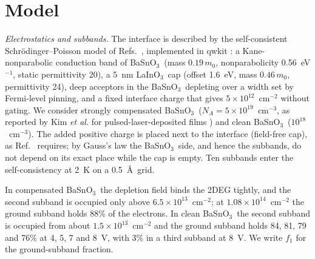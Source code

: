 \documentclass[11pt]{article}
\newcommand{\LIO}{\texorpdfstring{LaInO$_3$}{LaInO3}}
\newcommand{\BSO}{\texorpdfstring{BaSnO$_3$}{BaSnO3}}
\begin{document}
\section{Model}\label{sec:model}
\emph{Electrostatics and subbands.} The interface is described by the self-consistent Schr\"odinger--Poisson model of Refs.~\cite{OwnbyMAT01,OwnbyMAT02}, implemented in qwkit \cite{qwkit}: a Kane-nonparabolic conduction band of \BSO\ (mass $0.19\,m_0$, nonparabolicity 0.56~eV$^{-1}$, static permittivity 20), a 5~nm \LIO\ cap (offset 1.6~eV, mass $0.46\,m_0$, permittivity 24), deep acceptors in the \BSO\ depleting over a width set by Fermi-level pinning, and a fixed interface charge that gives $5\times10^{12}$~cm$^{-2}$ without gating. We consider strongly compensated \BSO\ ($N_A=5\times10^{19}$~cm$^{-3}$, as reported by Kim \emph{et al.} for pulsed-laser-deposited films \cite{Kim2019LIO}) and clean \BSO\ ($10^{18}$~cm$^{-3}$). The added positive charge is placed next to the interface (field-free cap), as Ref.~\cite{OwnbyMAT02} requires; by Gauss's law the \BSO\ side, and hence the subbands, do not depend on its exact place while the cap is empty. Ten subbands enter the self-consistency at 2~K on a 0.5~\AA\ grid.

In compensated \BSO\ the depletion field binds the 2DEG tightly, and the second subband is occupied only above $6.5\times10^{13}$~cm$^{-2}$; at $1.08\times10^{14}$~cm$^{-2}$ the ground subband holds 88\% of the electrons. In clean \BSO\ the second subband is occupied from about $1.5\times10^{13}$~cm$^{-2}$ and the ground subband holds 84, 81, 79 and 76\% at 4, 5, 7 and 8~V, with 3\% in a third subband at 8~V. We write $f_1$ for the ground-subband fraction.
\end{document}
